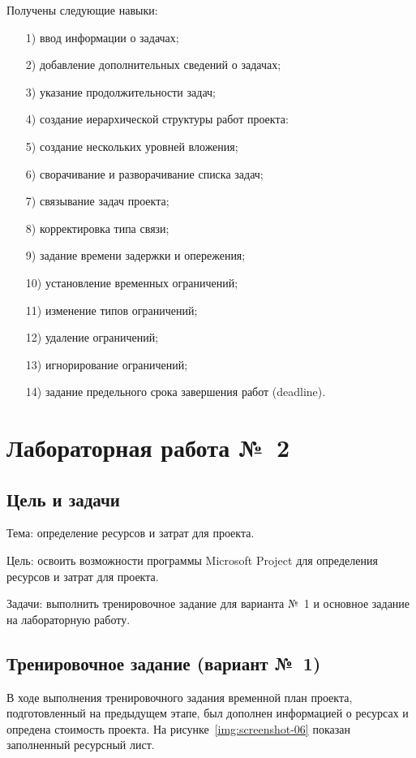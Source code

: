\documentclass{bmstu}
\begin{document}
Получены следующие навыки:
\begin{enumerate}
\item[1)] ввод информации о задачах;
\item[2)] добавление дополнительных сведений о задачах;
\item[3)] указание продолжительности задач;
\item[4)] создание иерархической структуры работ проекта:
\item[5)] создание нескольких уровней вложения;
\item[6)] сворачивание и разворачивание списка задач;
\item[7)] связывание задач проекта;
\item[8)] корректировка типа связи;
\item[9)] задание времени задержки и опережения;
\item[10)] установление временных ограничений;
\item[11)] изменение типов ограничений;
\item[12)] удаление ограничений;
\item[13)] игнорирование ограничений;
\item[14)] задание предельного срока завершения работ (deadline).
\end{enumerate}

\chapter{Лабораторная работа №~2}

\section{Цель и задачи}

Тема: определение ресурсов и затрат для проекта.

Цель: освоить возможности программы Microsoft Project для определения ресурсов и затрат для проекта.

Задачи: выполнить тренировочное задание для варианта №~1 и основное задание на лабораторную работу.

\section{Тренировочное задание (вариант №~1)}

В ходе выполнения тренировочного задания временной план проекта, подготовленный на предыдущем этапе, был дополнен информацией о ресурсах и опредена стоимость проекта. 
На рисунке~\ref{img:screenshot-06} показан заполненный ресурсный лист.
    
\end{document}

